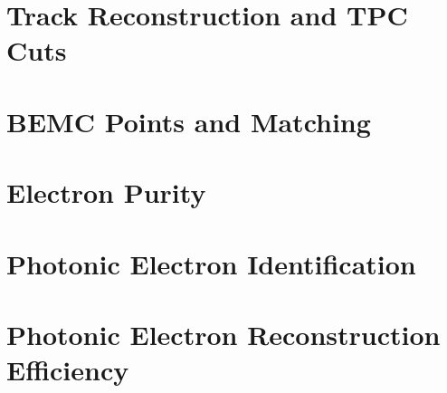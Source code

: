 \section{Track Reconstruction and TPC Cuts}

\section{BEMC Points and Matching}

\section{Electron Purity}

\section{Photonic Electron Identification}

\section{Photonic Electron Reconstruction Efficiency}

